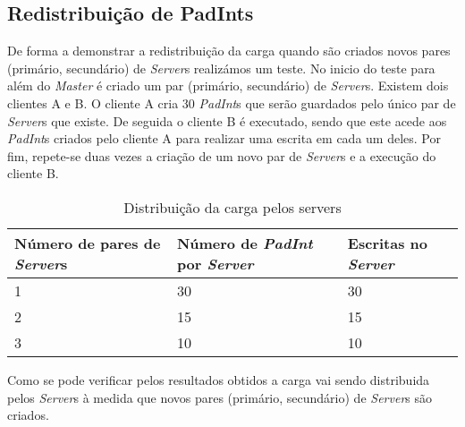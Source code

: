 \subsection{Redistribuição de PadInts}

De forma a demonstrar a redistribuição da carga quando são criados novos pares (primário, secundário) de \textit{Server}s realizámos um teste. No inicio do teste para além do \textit{Master} é criado um par (primário, secundário) de \textit{Server}s. Existem dois clientes A e B. O cliente A cria 30 \textit{PadInt}s que serão guardados pelo único par de \textit{Server}s que existe. De seguida o cliente B é executado, sendo que este acede aos \textit{PadInt}s criados pelo cliente A para realizar uma escrita em cada um deles. Por fim, repete-se duas vezes a criação de um novo par de \textit{Server}s e a execução do cliente B.
\begin{table}[H]
\centering
\begin{tabular}{| p{2.2cm} | p{2.2cm} | p{2.2cm} |}
\hline
\textbf{Número de pares de \textit{Server}s} &\textbf{Número de \textit{PadInt} por \textit{Server}} & \textbf{Escritas no \textit{Server}} \\
\hline
1 & 30 & 30  \\
\hline
2 & 15 & 15  \\
\hline
3 & 10 & 10 \\
\hline
\end{tabular}
\caption{Distribuição da carga pelos servers} \label{figRedistribuicao}
\end{table}

Como se pode verificar pelos resultados obtidos a carga vai sendo distribuida pelos \textit{Server}s à medida que novos pares (primário, secundário) de \textit{Server}s são criados.